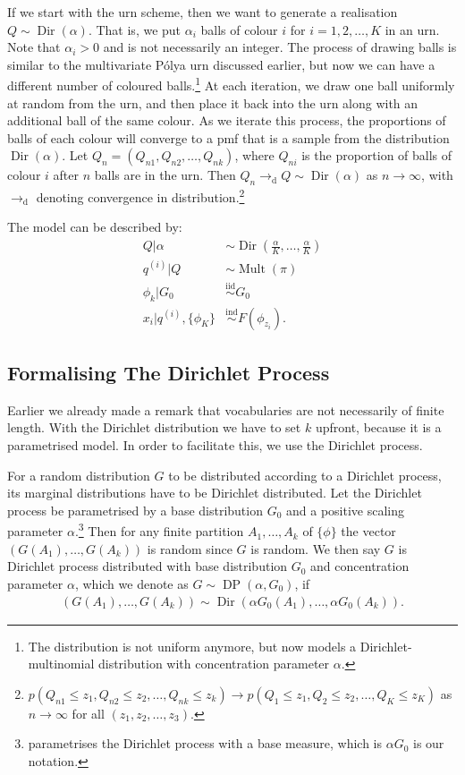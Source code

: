 If we start with the urn scheme, then we want to generate a realisation $Q\sim\operatorname{Dir}(\alpha)$. That is, we put $\alpha_i$ balls of colour $i$ for $i=1,2,\ldots,K$ in an urn. Note that $\alpha_i>0$ and is not necessarily an integer. The process of drawing balls is similar to the multivariate P\'olya urn discussed earlier, but now we can have a different number of coloured balls.\footnote{The distribution is not uniform anymore, but now models a Dirichlet-multinomial distribution with concentration parameter $\alpha$.} At each iteration, we draw one ball uniformly at random from the urn, and then place it back into the urn along with an additional ball of the same colour. As we iterate this process, the proportions of balls of each colour will converge to a pmf that is a sample from the distribution $\operatorname{Dir}(\alpha)$. Let $Q_n = (Q_{n1}, Q_{n2},\ldots,Q_{nk})$, where $Q_{ni}$ is the proportion of balls of colour $i$ after $n$ balls are in the urn. Then $Q_n \rightarrow_\text{d} Q \sim \operatorname{Dir}(\alpha)$ as $n\rightarrow\infty$, with $\rightarrow_\text{d}$ denoting convergence in distribution.\footnote{$p(Q_{n1}\leq z_1, Q_{n2}\leq z_2, \ldots, Q_{nk}\leq z_k) \rightarrow p(Q_1\leq z_1, Q_2\leq z_2,\ldots,Q_K\leq z_K)$ as $n\rightarrow\infty$ for all $(z_1,z_2,\ldots,z_3)$.} 

The model can be described by:
\begin{align}
    Q|\alpha &\sim \operatorname{Dir}(\frac{\alpha}{K},\ldots,\frac{\alpha}{K}) \\
    q^{(i)}|Q&\sim\operatorname{Mult}(\pi) \\
    \phi_k | G_0 &\overset{\text{iid}}{\sim} G_0 \\
    x_i|q^{(i)},\{\phi_K\}&\overset{\text{ind}}{\sim} F(\phi_{z_i}).
\end{align}


\subsection{Formalising The Dirichlet Process}
Earlier we already made a remark that vocabularies are not necessarily of finite length. With the Dirichlet distribution we have to set $k$ upfront, because it is a parametrised model. In order to facilitate this, we use the Dirichlet process. 

For a random distribution $G$ to be distributed according to a Dirichlet process, its marginal distributions have to be Dirichlet distributed. Let the Dirichlet process be parametrised by a base distribution $G_0$ and a positive scaling parameter $\alpha$.\footnote{\citet{Ferguson1973A} parametrises the Dirichlet process with a base measure, which is $\alpha G_0$ is our notation.} Then for any finite partition $A_1,\ldots,A_k$ of $\{\phi\}$ the vector $(G(A_1),\ldots,G(A_k))$ is random since $G$ is random. We then say $G$ is Dirichlet process distributed with base distribution $G_0$ and concentration parameter $\alpha$, which we denote as $G\sim\operatorname{DP}(\alpha, G_0)$, if 
\begin{align}
	(G(A_1),\ldots,G(A_k)) \sim \operatorname{Dir}(\alpha G_0(A_1), \ldots,\alpha G_0(A_k)).
\end{align}

